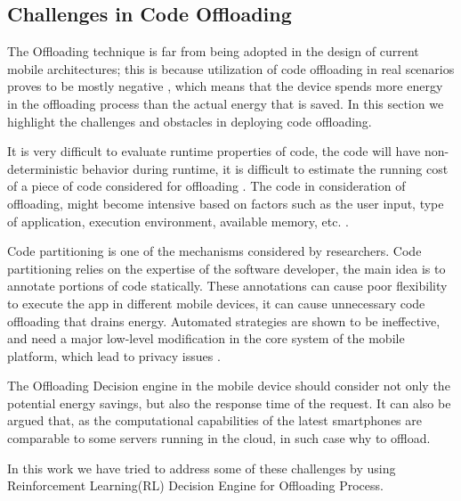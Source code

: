 \documentclass[12pt]{report}
\begin{document}
\subsection{Challenges in Code Offloading}

The Offloading technique is far from being adopted in the design of current mobile architectures; this is because utilization of code offloading in real scenarios proves to be mostly negative \cite{flores2013mobile}, which means that the device spends
more energy in the offloading process than the actual energy that is saved. In this section we highlight the challenges and obstacles in deploying code offloading.

It is very difficult to evaluate runtime properties of code, the code will have non-deterministic behavior during runtime, it is difficult to estimate the running cost of a piece of code considered for offloading \cite{flores2015mobile}. The code in consideration of offloading, might become intensive based on factors such as the user input, type of application, execution environment, available memory, etc. \cite{flores2013mobile}.

Code partitioning is one of the mechanisms considered by researchers. Code partitioning relies on the expertise of the software developer, the main idea is to annotate portions of code statically. These annotations can cause poor flexibility to execute the app in different mobile devices, it can cause unnecessary code offloading that drains energy. Automated strategies are shown to be ineffective, and need a major low-level modification in the core system of the mobile platform, which lead to privacy issues \cite{flores2015mobile}.

The Offloading Decision engine in the mobile device should consider not only the potential energy savings, but also the response time of the request. It can also be argued that, as the computational capabilities of the latest smartphones are comparable to some servers running in the cloud, in such case why to offload.

In this work we have tried to address some of these challenges by using Reinforcement Learning(RL) Decision Engine for Offloading Process.
\end{document}
